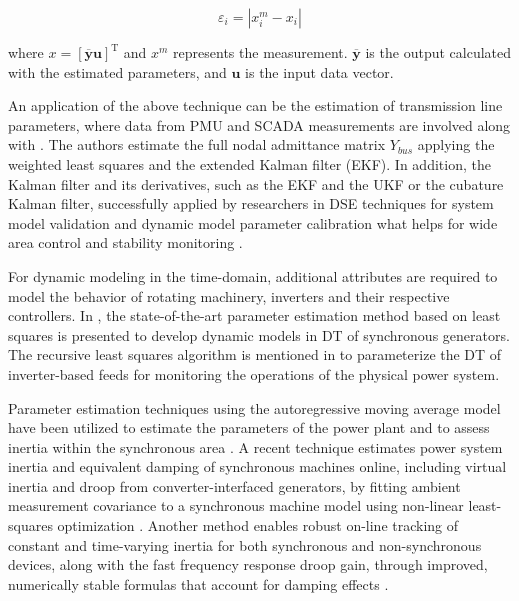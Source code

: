 \begin{equation}
    \varepsilon_i=\left|x_i^m-x_i\right|
\end{equation}

where $x=[\overline{\boldsymbol{y}} \boldsymbol{u}]^{\mathrm{T}}$ and $x^m$ represents the measurement. $\overline{\boldsymbol{y}}$ is the output calculated with the estimated parameters, and $\boldsymbol{u}$ is the input data vector. 

An application of the above technique can be the estimation of transmission line parameters, where data from PMU and SCADA measurements are involved along with \autocite{PEGORARO2023113175, Albuquerque2021, JYang2010, 7465793, 7807323, 9494814}. The authors estimate the full nodal admittance matrix $Y_{bus}$ applying the weighted least squares and the extended Kalman filter (EKF). In addition, the Kalman filter and its derivatives, such as the EKF and the UKF or the cubature Kalman filter, successfully applied by researchers in DSE techniques for system model validation and dynamic model parameter calibration \autocite{6420999, 8070959} what helps for wide area control and stability monitoring \autocite{9210125}.

For dynamic modeling in the time-domain, additional attributes are required to model the behavior of rotating machinery, inverters and their respective controllers. In \autocite{9640105}, the state-of-the-art parameter estimation method based on least squares is presented \autocite{dbt_mods_00026727} to develop dynamic models in DT of synchronous generators. The recursive least squares algorithm \autocite{LANDAU2001469} is mentioned in \autocite{conf_song_2020} to parameterize the DT of inverter-based feeds for monitoring the operations of the physical power system.

Parameter estimation techniques using the autoregressive moving average model have been utilized to estimate the parameters of the power plant \autocite{754830} and to assess inertia within the synchronous area \autocite{8370893}. A recent technique estimates power system inertia and equivalent damping of synchronous machines online, including virtual inertia and droop from converter-interfaced generators, by fitting ambient measurement covariance to a synchronous machine model using non-linear least-squares optimization \autocite{10015690}. Another method enables robust on-line tracking of constant and time-varying inertia for both synchronous and non-synchronous devices, along with the fast frequency response droop gain, through improved, numerically stable formulas that account for damping effects \autocite{9253523}. 

